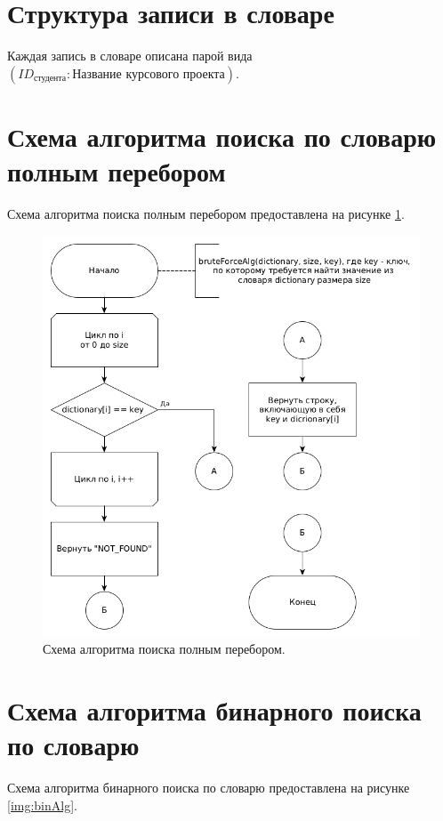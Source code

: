 \documentclass[12pt]{report}
\begin{document}
\section{Структура записи в словаре}
Каждая запись в словаре описана парой вида $(ID_{\textit{студента}} : \textit{Название курсового проекта})$.

\section{Схема алгоритма поиска по словарю полным перебором}
Схема алгоритма поиска полным перебором предоставлена на рисунке \ref{img:brutAlg}.

\begin{figure}
\begin{center}
\includegraphics[scale=0.4]{inc/img/brutAlg.png}
\captionsetup{justification=centering}
	\caption{Схема алгоритма поиска полным перебором.}
	\label{img:brutAlg}	
\end{center}
\end{figure}

\section{Схема алгоритма бинарного поиска по словарю}
Схема алгоритма бинарного поиска по словарю предоставлена на рисунке \ref{img:binAlg}.
\end{document}
